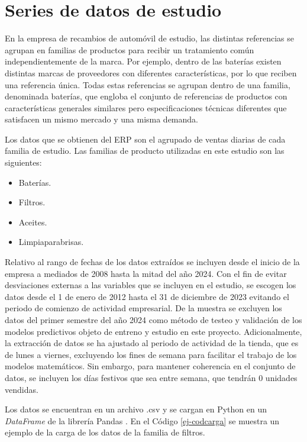 \section{Series de datos de estudio}

En la empresa de recambios de automóvil de estudio, las distintas referencias se agrupan en familias de productos para recibir un tratamiento común independientemente de la marca. Por ejemplo, dentro de las baterías existen distintas marcas de proveedores con diferentes características, por lo que reciben una referencia única. Todas estas referencias se agrupan dentro de una familia, denominada baterías, que engloba el conjunto de referencias de productos con características generales similares pero especificaciones técnicas diferentes que satisfacen un mismo mercado y una misma demanda. 

Los datos que se obtienen del ERP son el agrupado de ventas diarias de cada familia de estudio. Las familias de producto utilizadas en este estudio son las siguientes:

\begin{itemize}
    \item Baterías.
    \item Filtros.
    \item Aceites.
    \item Limpiaparabrisas.
\end{itemize} 

Relativo al rango de fechas de los datos extraídos se incluyen desde el inicio de la empresa a mediados de 2008 hasta la mitad del año 2024. Con el fin de evitar desviaciones externas a las variables que se incluyen en el estudio, se escogen los datos desde el 1 de enero de 2012 hasta el 31 de diciembre de 2023 evitando el periodo de comienzo de actividad empresarial. De la muestra se excluyen los datos del primer semestre del año 2024 como método de testeo y validación de los modelos predictivos objeto de entreno y estudio en este proyecto. Adicionalmente, la extracción de datos se ha ajustado al periodo de actividad de la tienda, que es de lunes a viernes, excluyendo los fines de semana para facilitar el trabajo de los modelos matemáticos. Sin embargo, para mantener coherencia en el conjunto de datos, se incluyen los días festivos que sea entre semana, que tendrán 0 unidades vendidas.

Los datos se encuentran en un archivo .csv y se cargan en Python en un \textit{DataFrame} de la librería Pandas \cite{pandas}. En el Código \ref*{ej-codcarga} se muestra un ejemplo de la carga de los datos de la familia de filtros. 

